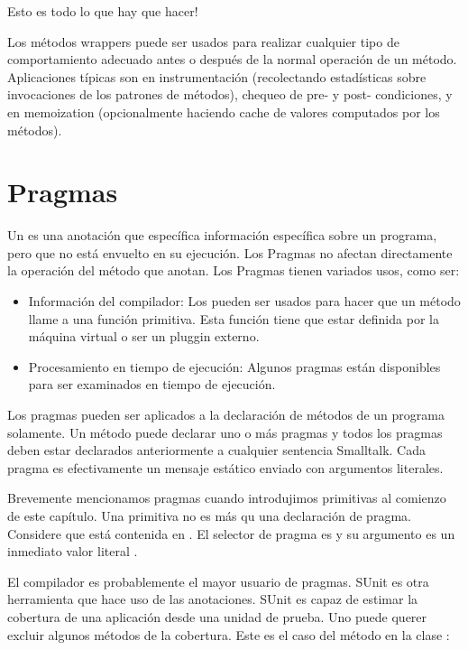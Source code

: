 \documentclass[a4paper,10pt,twoside]{book}
\begin{document}
Esto es todo lo que hay que hacer!

Los m\'etodos wrappers puede ser usados para realizar cualquier tipo de comportamiento adecuado antes o despu\'es de la normal operaci\'on de un m\'etodo. Aplicaciones t\'ipicas son en instrumentaci\'on (recolectando estad\'isticas sobre invocaciones de los patrones de m\'etodos), chequeo de pre- y post- condiciones,
y en memoization (opcionalmente haciendo cache de valores computados por los m\'etodos).

\section{Pragmas}

Un  es una anotación que espec\'ifica informaci\'on espec\'ifica sobre un programa, pero que no est\'a envuelto en su ejecuci\'on. Los Pragmas no afectan directamente la operaci\'on del m\'etodo que anotan. Los Pragmas tienen variados usos, como ser:

\begin{itemize}
\item Informaci\'on del compilador: Los  pueden ser usados para hacer que un m\'etodo llame a una funci\'on primitiva. Esta funci\'on tiene que estar definida por la m\'aquina virtual o ser un pluggin externo.

\item Procesamiento en tiempo de ejecuci\'on: Algunos pragmas est\'an disponibles para ser examinados en tiempo de ejecuci\'on.
\end{itemize}

Los pragmas pueden ser aplicados a la declaraci\'on de m\'etodos de un programa solamente. Un m\'etodo puede declarar uno o m\'as pragmas y todos los pragmas deben estar declarados anteriormente a cualquier sentencia Smalltalk. Cada pragma es efectivamente un mensaje est\'atico enviado con argumentos literales.

Brevemente mencionamos pragmas cuando introdujimos primitivas al comienzo de este cap\'itulo. Una primitiva no es m\'as qu una declaraci\'on de pragma. Considere  que est\'a contenida en . El selector de pragma es  y su argumento es un inmediato valor literal .

El compilador es probablemente el mayor usuario de pragmas. SUnit es otra herramienta que hace uso de las anotaciones. SUnit es capaz de estimar la cobertura de una aplicaci\'on desde una unidad de prueba. Uno puede querer excluir algunos m\'etodos de la cobertura. Este es el caso del m\'etodo  en la clase :  
\end{document}
